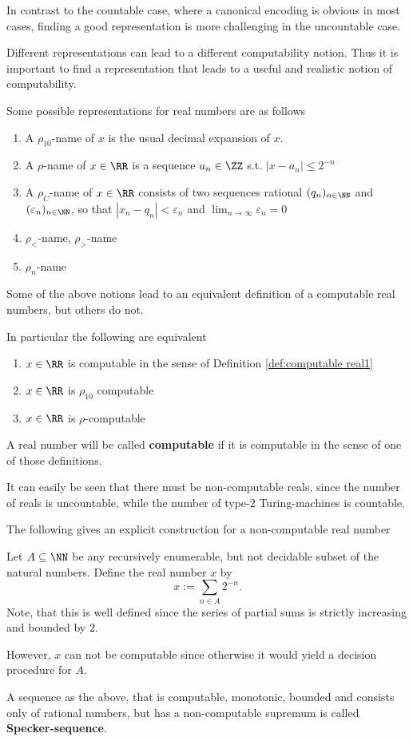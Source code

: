 In contrast to the countable case, where a canonical encoding is obvious in most
cases, finding a good representation is more challenging in the uncountable
case.

Different representations can lead to a different computability notion.
Thus it is important to find a representation that leads to a useful and
realistic notion of computability.

Some possible representations for real numbers are as follows
\begin{enumerate}
\item A $\rho_{10}$-name of $x$ is the usual decimal expansion of $x$.
\item A $\rho$-name of $x \in \RR$ is a sequence $a_n \in \ZZ$ s.t. $| x - a_n | \leq 2^{-n}$
\item  A $\rho_C$-name of $x \in \RR$ consists of two sequences rational $(q_n)_{n \in \NN}$ and $(\varepsilon_n)_{n \in \NN}$, so that 
$| x_n - q_n | < \varepsilon_n$ and $\lim_{n \to \infty} \varepsilon_n = 0$  
\item $\rho_<$-name, $\rho_>$-name
\item $\rho_n$-name 
\end{enumerate}
Some of the above notions lead to an equivalent definition of a computable real
numbers, but others do not.

In particular the following are equivalent
\begin{enumerate}
  \item $x \in \RR$ is computable in the sense of Definition
    \ref{def:computable real1}
  \item $x \in \RR$ is $\rho_{10}$ computable
  \item $x \in \RR$ is $\rho$-computable
\end{enumerate}
A real number will be called \textbf{computable} if it is computable in the sense of one of
those definitions.

It can easily be seen that there must be non-computable reals, since the number
of reals is uncountable, while the number of type-2 Turing-machines is
countable.

The following gives an explicit construction for a non-computable real number
\begin{example}
Let $A \subseteq \NN$ be any recursively enumerable, but not decidable subset
of the natural numbers.
Define the real number $x$ by
$$ x := \sum_{n \in A} 2^{-n}. $$
Note, that this is well defined since the series of partial sums is strictly
increasing and bounded by $2$.

However, $x$ can not be computable since otherwise it would yield a decision
procedure for $A$. 
\end{example}
A sequence as the above, that is computable, monotonic, bounded and consists
only of rational numbers, but has a non-computable supremum is called \textbf{Specker-sequence}.

